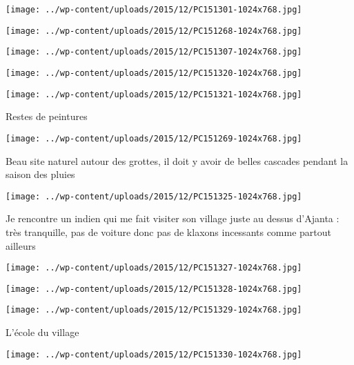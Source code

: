 \centerline{\texttt{[image: ../wp-content/uploads/2015/12/PC151301-1024x768.jpg]} } 
 \newline
 \newline
\centerline{\texttt{[image: ../wp-content/uploads/2015/12/PC151268-1024x768.jpg]} } 
 \newline
 \newline
\centerline{\texttt{[image: ../wp-content/uploads/2015/12/PC151307-1024x768.jpg]} } 
 \newline
 \newline
\centerline{\texttt{[image: ../wp-content/uploads/2015/12/PC151320-1024x768.jpg]} } 
 \newline
 \newline
\centerline{\texttt{[image: ../wp-content/uploads/2015/12/PC151321-1024x768.jpg]} } 
 \newline
 Restes de peintures \newline
 \newline
\centerline{\texttt{[image: ../wp-content/uploads/2015/12/PC151269-1024x768.jpg]} } 
 \newline
 Beau site naturel autour des grottes, il doit y avoir de belles cascades pendant la saison des pluies \newline
 \newline
\centerline{\texttt{[image: ../wp-content/uploads/2015/12/PC151325-1024x768.jpg]} } 
 \newline
 Je rencontre un indien qui me fait visiter son village juste au dessus d'Ajanta : très tranquille, pas de voiture donc pas de klaxons incessants comme partout ailleurs \newline
 \newline
\centerline{\texttt{[image: ../wp-content/uploads/2015/12/PC151327-1024x768.jpg]} } 
 \newline
 \newline
\centerline{\texttt{[image: ../wp-content/uploads/2015/12/PC151328-1024x768.jpg]} } 
 \newline
 \newline
\centerline{\texttt{[image: ../wp-content/uploads/2015/12/PC151329-1024x768.jpg]} } 
 \newline
 L'école du village \newline
 \newline
\centerline{\texttt{[image: ../wp-content/uploads/2015/12/PC151330-1024x768.jpg]} } 
